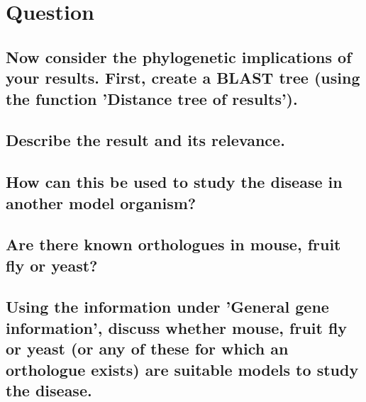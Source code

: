 \section{Question}

\subsection{Now consider the phylogenetic implications of your results. First, create a BLAST tree (using the function 'Distance tree of results').}


\subsection{Describe the result and its relevance.}


\subsection{How can this be used to study the disease in another model organism?}


\subsection{Are there known orthologues in mouse, fruit fly or yeast?}


\subsection{Using the information under 'General gene information', discuss whether mouse, fruit fly or yeast (or any of these for which an orthologue exists) are suitable models to study the disease.}

\newpage
